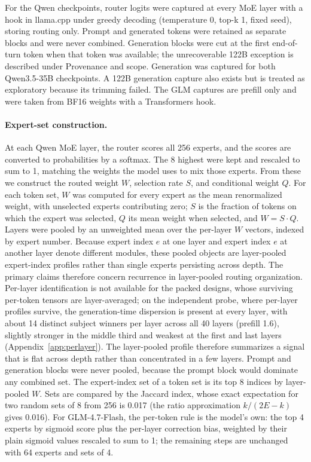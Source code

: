 \documentclass[10pt,twocolumn]{article}
\begin{document}
For the Qwen checkpoints, router logits were captured at every MoE layer with a hook in llama.cpp under greedy decoding (temperature 0, top-k 1, fixed seed), storing routing only. Prompt and generated tokens were retained as separate blocks and were never combined. Generation blocks were cut at the first end-of-turn token when that token was available; the unrecoverable 122B exception is described under Provenance and scope. Generation was captured for both Qwen3.5-35B checkpoints. A 122B generation capture also exists but is treated as exploratory because its trimming failed. The GLM captures are prefill only and were taken from BF16 weights with a Transformers hook.

\paragraph{Expert-set construction.} At each Qwen MoE layer, the router scores all 256 experts, and the scores are converted to probabilities by a softmax. The 8 highest were kept and rescaled to sum to 1, matching the weights the model uses to mix those experts. From these we construct the routed weight $W$, selection rate $S$, and conditional weight $Q$. For each token set, $W$ was computed for every expert as the mean renormalized weight, with unselected experts contributing zero; $S$ is the fraction of tokens on which the expert was selected, $Q$ its mean weight when selected, and $W = S \cdot Q$. Layers were pooled by an unweighted mean over the per-layer $W$ vectors, indexed by expert number. Because expert index $e$ at one layer and expert index $e$ at another layer denote different modules, these pooled objects are layer-pooled expert-index profiles rather than single experts persisting across depth. The primary claims therefore concern recurrence in layer-pooled routing organization. Per-layer identification is not available for the packed designs, whose surviving per-token tensors are layer-averaged; on the independent probe, where per-layer profiles survive, the generation-time dispersion is present at every layer, with about 14 distinct subject winners per layer across all 40 layers (prefill 1.6), slightly stronger in the middle third and weakest at the first and last layers (Appendix~\ref{app:perlayer}). The layer-pooled profile therefore summarizes a signal that is flat across depth rather than concentrated in a few layers. Prompt and generation blocks were never pooled, because the prompt block would dominate any combined set. The expert-index set of a token set is its top 8 indices by layer-pooled $W$. Sets are compared by the Jaccard index, whose exact expectation for two random sets of 8 from 256 is 0.017 (the ratio approximation $k/(2E-k)$ gives 0.016). For GLM-4.7-Flash, the per-token rule is the model's own: the top 4 experts by sigmoid score plus the per-layer correction bias, weighted by their plain sigmoid values rescaled to sum to 1; the remaining steps are unchanged with 64 experts and sets of 4.
\end{document}
